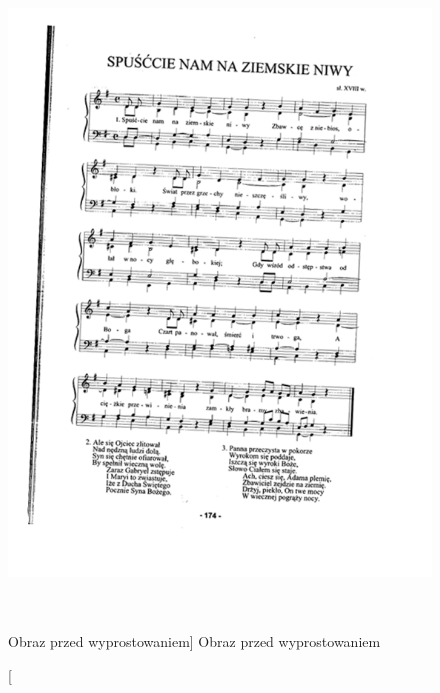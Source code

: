 \documentclass[a4paper,12pt]{article}
\begin{document}
		    
        	
        		\begin{figure}[!ht]  
        		    \begin{center}
        			    \includegraphics[height=17cm, frame]{image//exampleImage//003_a.png} 
        		    \end{center}
        		    \caption
        			    [Obraz przed wyprostowaniem]  
            			{Obraz przed wyprostowaniem}  
        	    \end{figure}
        			
\end{document}
